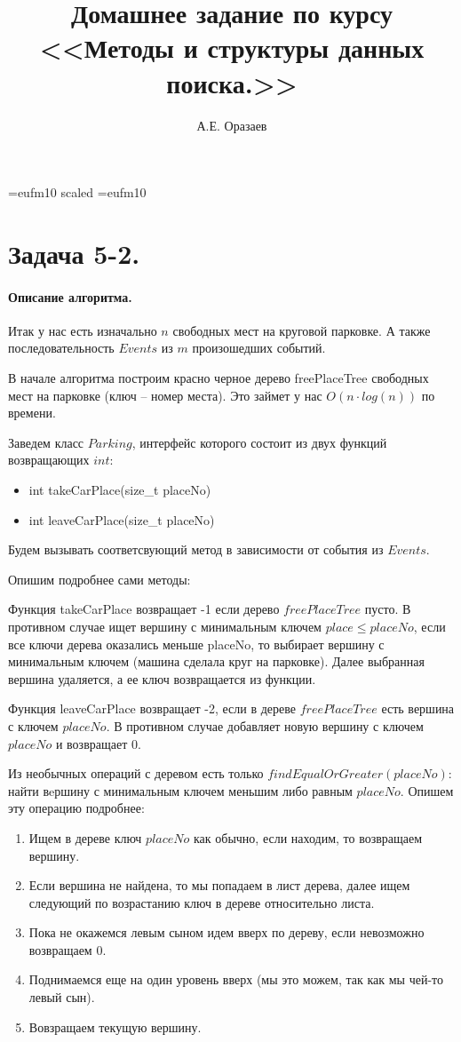 \documentclass[12pt]{article}
\title{\bf Домашнее задание по курсу \\ <<Методы
и структуры данных поиска.>>}
\author{А.Е. Оразаев}
\date{}
\begin{document}
\voffset=-20mm
\hoffset=-12mm
\font\Got=eufm10 scaled \font\Got=eufm10

\maketitle

\section{Задача 5-2.}
\paragraph{Описание алгоритма.}
Итак у нас есть изначально $ n $ свободных мест на круговой парковке.
А также последовательность $ Events $ из $ m $ произошедших событий.

В начале алгоритма построим красно черное дерево freePlaceTree свободных
мест на парковке (ключ -- номер места). Это займет у нас $ O(n \cdot log(n)) $
по времени.

Заведем класс $ Parking $, интерфейс которого состоит из двух функций
возвращающих $ int $:
\begin{itemize}
    \item int takeCarPlace(size\_t placeNo)
    \item int leaveCarPlace(size\_t placeNo)
\end{itemize}
Будем вызывать соответсвующий метод в зависимости от события из $ Events $.

Опишим подробнее сами методы:

Функция takeCarPlace возвращает -1 если дерево $ freePlaceTree $ пусто.
В противном случае ищет вершину с минимальным ключем $place \le placeNo$,
если все ключи дерева оказались меньше placeNo, то выбирает вершину с
минимальным ключем (машина сделала круг на парковке).
Далее выбранная вершина удаляется, а ее ключ возвращается из функции.

Функция leaveCarPlace возвращает -2, если в дереве $ freePlaceTree $ есть
вершина с ключем $ placeNo $. В противном случае добавляет новую вершину
с ключем $ placeNo $ и возвращает 0.

Из необычных операций с деревом есть только $ findEqualOrGreater(placeNo) $:
найти вeршину с минимальным ключем меньшим либо равным $ placeNo $. Опишем
эту операцию подробнее:
\begin{enumerate}
    \item Ищем в дереве ключ $ placeNo $ как обычно, если находим, то
          возвращаем вершину.
    \item Если вершина не найдена, то мы попадаем в лист дерева, далее
          ищем следующий по возрастанию ключ в дереве относительно листа.
    \item Пока не окажемся левым сыном идем вверх по дереву, если невозможно
          возвращаем 0.
    \item Поднимаемся еще на один уровень вверх (мы это можем, так как мы
          чей-то левый сын).
    \item Вовзращаем текущую вершину.
\end{enumerate}
\end{document}
